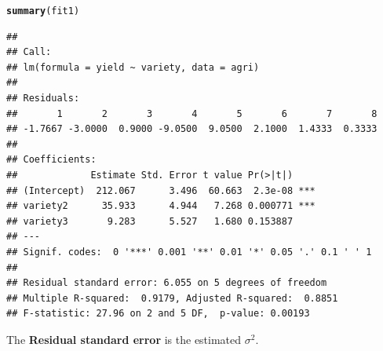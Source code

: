 \documentclass[11pt, a4paper]{article}\usepackage[]{graphicx}\usepackage[]{xcolor}
\makeatletter
\newcommand{\hlstd}[1]{\textcolor[rgb]{0.345,0.345,0.345}{#1}}%
\newcommand{\hlkwd}[1]{\textcolor[rgb]{0.737,0.353,0.396}{\textbf{#1}}}%
\newenvironment{kframe}{%
 \def\at@end@of@kframe{}%
 \ifinner\ifhmode%
  \def\at@end@of@kframe{\end{minipage}}%
  \begin{minipage}{\columnwidth}%
 \fi\fi%
 \def\FrameCommand##1{\hskip\@totalleftmargin \hskip-\fboxsep
 \colorbox{shadecolor}{##1}\hskip-\fboxsep
     \hskip-\linewidth \hskip-\@totalleftmargin \hskip\columnwidth}%
 \MakeFramed {\advance\hsize-\width
   \@totalleftmargin\z@ \linewidth\hsize
   \@setminipage}}%
 {\par\unskip\endMakeFramed%
 \at@end@of@kframe}
\newenvironment{knitrout}{}{} %
\makeatother
\begin{document}
\begin{knitrout}
\color{fgcolor}\begin{kframe}
\begin{alltt}
\hlkwd{summary}\hlstd{(fit1)}
\end{alltt}
\begin{verbatim}
## 
## Call:
## lm(formula = yield ~ variety, data = agri)
## 
## Residuals:
##       1       2       3       4       5       6       7       8 
## -1.7667 -3.0000  0.9000 -9.0500  9.0500  2.1000  1.4333  0.3333 
## 
## Coefficients:
##             Estimate Std. Error t value Pr(>|t|)    
## (Intercept)  212.067      3.496  60.663  2.3e-08 ***
## variety2      35.933      4.944   7.268 0.000771 ***
## variety3       9.283      5.527   1.680 0.153887    
## ---
## Signif. codes:  0 '***' 0.001 '**' 0.01 '*' 0.05 '.' 0.1 ' ' 1
## 
## Residual standard error: 6.055 on 5 degrees of freedom
## Multiple R-squared:  0.9179,	Adjusted R-squared:  0.8851 
## F-statistic: 27.96 on 2 and 5 DF,  p-value: 0.00193
\end{verbatim}
\end{kframe}
\end{knitrout}

The \textbf{Residual standard error} is the estimated $\sigma^2$.
\end{document}
